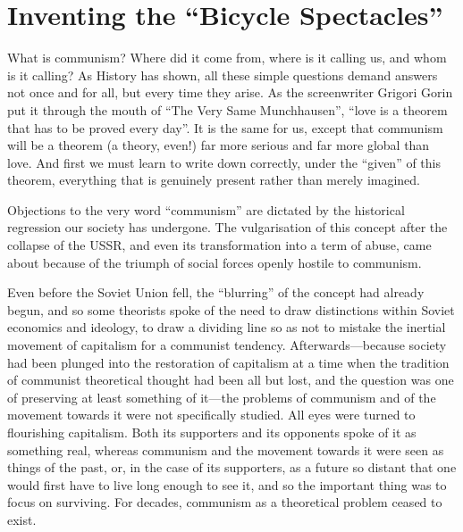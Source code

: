 \documentclass[12pt,a4paper,openany]{book}
\begin{document}
\ifSubfilesClassLoaded{\setcounter{page}{4}}{}
\section{Inventing the “Bicycle Spectacles”}
\label{sec:01_inventing_spectacles}

What is communism? Where did it come from, where is it calling us, and whom is it calling? As History has shown, all these simple questions demand answers not once and for all, but every time they arise. As the screenwriter Grigori Gorin put it through the mouth of “The Very Same Munchhausen”, “love is a theorem that has to be proved every day”. It is the same for us, except that communism will be a theorem (a theory, even!) far more serious and far more global than love. And first we must learn to write down correctly, under the “given” of this theorem, everything that is genuinely present rather than merely imagined.

Objections to the very word “communism” are dictated by the historical regression our society has undergone. The vulgarisation of this concept after the collapse of the USSR, and even its transformation into a term of abuse, came about because of the triumph of social forces openly hostile to communism.

Even before the Soviet Union fell, the “blurring” of the concept had already begun, and so some theorists spoke of the need to draw distinctions within Soviet economics and ideology, to draw a dividing line so as not to mistake the inertial movement of capitalism for a communist tendency. Afterwards—because society had been plunged into the restoration of capitalism at a time when the tradition of communist theoretical thought had been all but lost, and the question was one of preserving at least something of it—the problems of communism and of the movement towards it were not specifically studied. All eyes were turned to flourishing capitalism. Both its supporters and its opponents spoke of it as something real, whereas communism and the movement towards it were seen as things of the past, or, in the case of its supporters, as a future so distant that one would first have to live long enough to see it, and so the important thing was to focus on surviving. For decades, communism as a theoretical problem ceased to exist.
\end{document}
